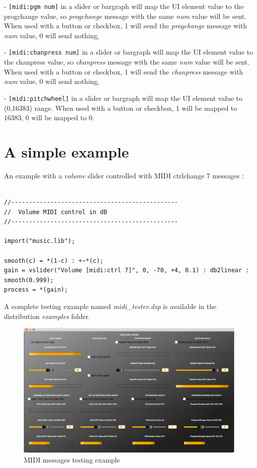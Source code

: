 - \lstinline'[midi:pgm num]' in a slider or bargraph will map the UI element value to the progchange value, so \emph{progchange} message with the same \emph{num} value will be sent. When used with a button or checkbox, 1 will send the \emph{progchange} message with \emph{num} value, 0 will send nothing,

- \lstinline'[midi:chanpress num]' in a slider or bargraph will map the UI element value to the chanpress value, so \emph{chanpress} message with the same \emph{num} value will be sent. When used with a button or checkbox, 1 will send the \emph{chanpress} message with \emph{num} value, 0 will send nothing,

- \lstinline'[midi:pitchwheel]' in a slider or bargraph will map the UI element value to (0,16383) range. When used with a button or checkbox, 1 will be mapped to 16383, 0 will be mapped to 0.

\section{A simple example}

An example with a \emph{volume} slider controlled with MIDI ctrlchange 7 messages :

\begin{lstlisting}

//-----------------------------------------------
//  Volume MIDI control in dB
//-----------------------------------------------

import("music.lib");

smooth(c) = *(1-c) : +~*(c);
gain = vslider("Volume [midi:ctrl 7]", 0, -70, +4, 0.1) : db2linear : smooth(0.999);
process = *(gain);

\end{lstlisting}

A complete testing example named  \emph{midi\_tester.dsp}  is available in the \faust distribution \emph{examples} folder.

\begin{figure}[h!]
  \centering
  \includegraphics[width=\textwidth]{images/midi-tester.png}
  \caption{MIDI messages testing example}   
  \label{fig:midi-tester}
\end{figure}

